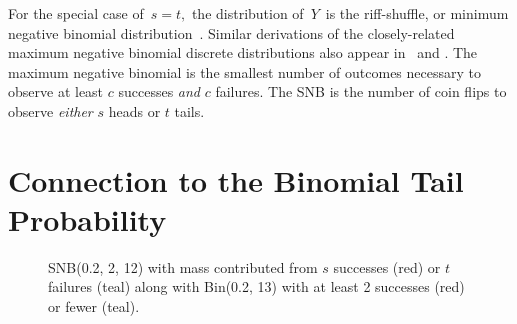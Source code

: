 \documentclass[review]{elsarticle}
\begin{document}
For the special case of $\,s=t,$ the distribution of $\,Y\,$ is the
riff-shuffle, or minimum negative binomial distribution~\citep{Uppuluri1970}.
Similar derivations of the closely-related maximum negative binomial 
discrete distributions also appear in~\cite{Zhang2000}
and \cite{Zelterman2005}.
The maximum negative binomial is the smallest number of outcomes necessary to 
observe at least $c$ successes {\em and} $c$ failures. The SNB is the 
number of coin flips to observe {\em either} $s$ heads or $t$ tails.

\section{Connection to the Binomial Tail Probability}

\begin{figure}[t!]
\centering
{}
\hfill
{}
\caption{
SNB(0.2, 2, 12) with mass contributed from 
$s$ successes (red) or $t$ failures (teal) along with Bin(0.2, 13) with
at least 2 successes (red) or fewer (teal).
}
\label{fig:kane_viz}
\end{figure}
\end{document}
